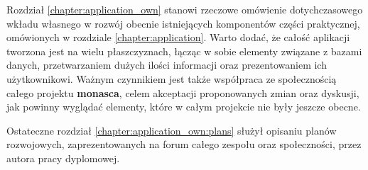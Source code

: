 Rozdział \ref{chapter:application_own} stanowi rzeczowe omówienie dotychczasowego wkładu własnego w rozwój obecnie istniejących
komponentów części praktycznej, omówionych w rozdziale \ref{chapter:application}. Warto dodać, że całość aplikacji tworzona 
jest na wielu płaszczyznach, łącząc w sobie elementy związane z bazami danych, przetwarzaniem dużych ilości informacji
oraz prezentowaniem ich użytkownikowi. Ważnym czynnikiem jest także współpraca ze społecznością całego 
projektu \textbf{monasca}, celem akceptacji proponowanych zmian oraz dyskusji, jak powinny wyglądać elementy, które w całym 
projekcie nie były jeszcze obecne.

Ostateczne rozdział \ref{chapter:application_own:plans} służył opisaniu planów rozwojowych, zaprezentowanych na
forum całego zespołu oraz społeczności, przez autora pracy dyplomowej. 
